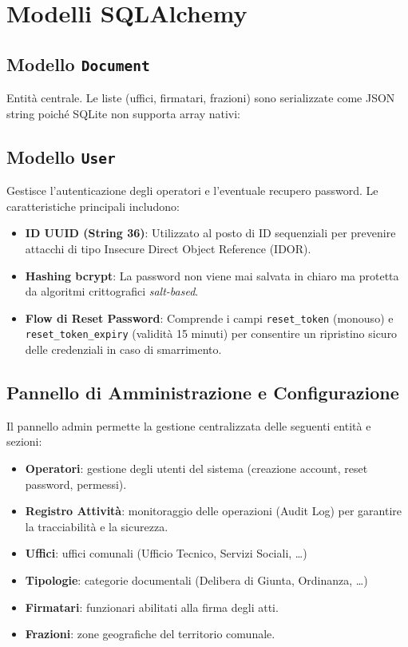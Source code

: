\documentclass[12pt,a4paper,oneside]{report}
\begin{document}
\section{Modelli SQLAlchemy}

\subsection{Modello \texttt{Document}}

Entit\`{a} centrale. Le liste (uffici, firmatari, frazioni) sono serializzate come JSON string
poich\'{e} SQLite non supporta array nativi:

\subsection{Modello \texttt{User}}

Gestisce l'autenticazione degli operatori e l'eventuale recupero password. Le caratteristiche principali includono:
\begin{itemize}
    \item \textbf{ID UUID (String 36)}: Utilizzato al posto di ID sequenziali per prevenire attacchi di tipo Insecure Direct Object Reference (IDOR).
    \item \textbf{Hashing bcrypt}: La password non viene mai salvata in chiaro ma protetta da algoritmi crittografici \textit{salt-based}.
    \item \textbf{Flow di Reset Password}: Comprende i campi \texttt{reset\_token} (monouso) e \texttt{reset\_token\_expiry} (validit\`{a} 15 minuti) per consentire un ripristino sicuro delle credenziali in caso di smarrimento.
\end{itemize}

\subsection{Pannello di Amministrazione e Configurazione}

Il pannello admin permette la gestione centralizzata delle seguenti entit\`{a} e sezioni:
\begin{itemize}
    \item \textbf{Operatori}: gestione degli utenti del sistema (creazione account, reset password, permessi).
    \item \textbf{Registro Attivit\`{a}}: monitoraggio delle operazioni (Audit Log) per garantire la tracciabilit\`{a} e la sicurezza.
    \item \textbf{Uffici}: uffici comunali (Ufficio Tecnico, Servizi Sociali, \ldots)
    \item \textbf{Tipologie}: categorie documentali (Delibera di Giunta, Ordinanza, \ldots)
    \item \textbf{Firmatari}: funzionari abilitati alla firma degli atti.
    \item \textbf{Frazioni}: zone geografiche del territorio comunale.
\end{itemize}
\end{document}

